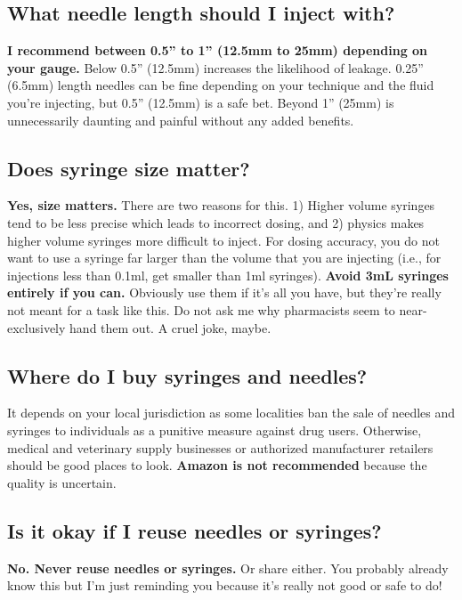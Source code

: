 \documentclass{article}
\begin{document}
\subsection{What needle length should I inject with?}

\textbf{I recommend between 0.5” to 1” (12.5mm to 25mm) depending on your gauge.} Below 0.5” (12.5mm) increases the likelihood of leakage. 0.25” (6.5mm) length needles can be fine depending on your technique and the fluid you’re injecting, but 0.5” (12.5mm) is a safe bet. Beyond 1” (25mm) is unnecessarily daunting and painful without any added benefits.

\subsection{Does syringe size matter?}

\textbf{Yes, size matters.} There are two reasons for this. 1) Higher volume syringes tend to be less precise which leads to incorrect dosing, and 2) physics makes higher volume syringes more difficult to inject. For dosing accuracy, you do not want to use a syringe far larger than the volume that you are injecting (i.e., for injections less than 0.1ml, get smaller than 1ml syringes). \textbf{Avoid 3mL syringes entirely if you can.} Obviously use them if it’s all you have, but they’re really not meant for a task like this. Do not ask me why pharmacists seem to near-exclusively hand them out. A cruel joke, maybe.

\subsection{Where do I buy syringes and needles?}

It depends on your local jurisdiction as some localities ban the sale of needles and syringes to individuals as a punitive measure against drug users. Otherwise, medical and veterinary supply businesses or authorized manufacturer retailers should be good places to look. \textbf{Amazon is not recommended} because the quality is uncertain.

\subsection{Is it okay if I reuse needles or syringes?}

\textbf{No. Never reuse needles or syringes. }Or share either. You probably already know this but I’m just reminding you because it’s really not good or safe to do!
\end{document}
